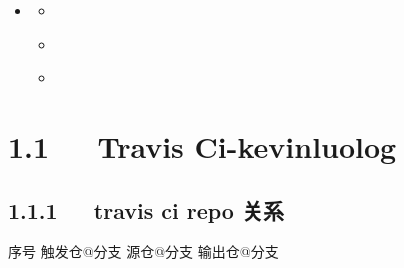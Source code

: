 \documentclass[letterpaper,12pt,english]{sphinxmanual}
\begin{document}
\begin{sphinxShadowBox}
\begin{itemize}
\begin{itemize}
\begin{itemize}
\begin{itemize}
\begin{itemize}
\begin{itemize}
\begin{itemize}
\end{itemize}

\end{itemize}

\end{itemize}

\item {} 
\label{\detokenize{001software/001install/001._u7f51_u7ad9/gitpage:id27}}{\hyperref[\detokenize{001software/001install/001._u7f51_u7ad9/gitpage:id5}]{}}
\begin{itemize}
\item {} 
\label{\detokenize{001software/001install/001._u7f51_u7ad9/gitpage:id28}}{\hyperref[\detokenize{001software/001install/001._u7f51_u7ad9/gitpage:id6}]{}}

\item {} 
\label{\detokenize{001software/001install/001._u7f51_u7ad9/gitpage:id29}}{\hyperref[\detokenize{001software/001install/001._u7f51_u7ad9/gitpage:windown}]{}}

\item {} 
\label{\detokenize{001software/001install/001._u7f51_u7ad9/gitpage:id30}}{\hyperref[\detokenize{001software/001install/001._u7f51_u7ad9/gitpage:travis}]{}}

\end{itemize}

\end{itemize}

\end{itemize}

\end{itemize}

\end{itemize}
\end{sphinxShadowBox}


\section{1.1   Travis Ci-kevinluolog}
\label{\detokenize{001software/001install/001._u7f51_u7ad9/gitpage:travis-ci-kevinluolog}}

\subsection{1.1.1   travis ci repo 关系}
\label{\detokenize{001software/001install/001._u7f51_u7ad9/gitpage:travis-ci-repo}}
序号  触发仓@分支  源仓@分支  输出仓@分支
\end{document}
